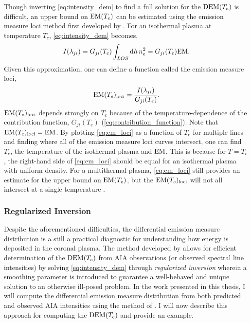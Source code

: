Though inverting \autoref{eq:intensity_dem} to find a full solution for the $\dem$ is difficult, an upper bound on $\emd$ can be estimated using the emission measure loci method first developed by \citet{veck_solar_1981}. For an isothermal plasma at temperature $T_c$, \autoref{eq:intensity_dem} becomes,
\begin{equation}
    I(\lambda_{ji}) = G_{ji}(T_c)\int_{LOS}\dd{h}n_e^2 = G_{ji}(T_c)\textup{EM}.
\end{equation}
Given this approximation, one can define a function called the emission measure loci,
\begin{equation}\label{eq:em_loci}
    \emd_{\textup{loci}} = \frac{I(\lambda_{ji})}{G_{ji}(T_e)}.
\end{equation}
$\emd_{\textup{loci}}$ depends strongly on $T_e$ because of the temperature-dependence of the contribution function, $G_{ji}(T_e)$ (\autoref{eq:contribution_function}). Note that $\emd[T_c]_{\textup{loci}}=\textup{EM}$. By plotting \autoref{eq:em_loci} as a function of $T_e$ for multiple lines and finding where all of the emission measure loci curves intersect, one can find $T_c$, the temperature of the isothermal plasma and $\textup{EM}$. This is because for $T=T_c$, the right-hand side of \autoref{eq:em_loci} should be equal for an isothermal plasma with uniform density. For a multithermal plasma, \autoref{eq:em_loci} still provides an estimate for the upper bound on $\emd$, but the $\emd_{\textup{loci}}$ will not all intersect at a single temperature \citep{phillips_ultraviolet_2008}.

\subsubsection{Regularized Inversion}\label{subsubsec:dem_regularized_inversion}

Despite the aforementioned difficulties, the differential emission measure distribution is a still a practical diagnostic for understanding how energy is deposited in the coronal plasma. The method developed by \citet{hannah_differential_2012} allows for efficient determination of the $\dem$ from AIA observations (or observed spectral line intensities) by solving \autoref{eq:intensity_dem} through \textit{regularized inversion} wherein a smoothing parameter is introduced to guarantee a well-behaved and unique solution to an otherwise ill-posed problem. In the work presented in this thesis, I will compute the differential emission measure distribution from both predicted and observed AIA intensities using the method of \citet{hannah_differential_2012}. I will now describe this approach for computing the $\dem$ and provide an example.

